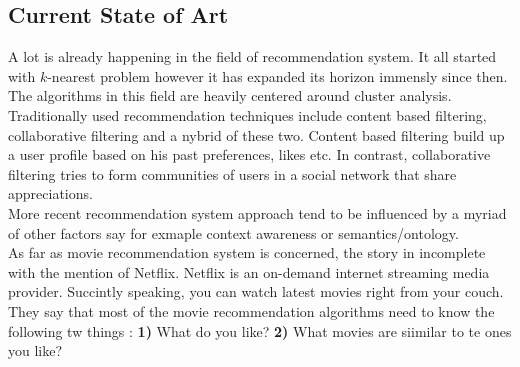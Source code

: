 \documentclass[twocolumn]{article}
\newcommand{\comment}[1]{}
\begin{document}
\subsection{Current State of Art}
A lot is already happening in the field of recommendation system. It all started with $k$-nearest problem however it has expanded its horizon immensly since then. The algorithms in this field are heavily centered around cluster analysis.\\
\newline
Traditionally used recommendation techniques include content based filtering, collaborative filtering and a nybrid of these two. Content based filtering build up a user profile based on his past preferences, likes etc. In contrast, collaborative filtering tries to form communities of users in a social network that share appreciations.\\
\newline
More recent recommendation system approach tend to be influenced by a myriad of other factors say for exmaple context awareness or semantics/ontology.\\
\newline
As far as movie recommendation system is concerned, the story in incomplete with the mention of Netflix. Netflix is an on-demand internet streaming media provider. Succintly speaking, you can watch latest movies right from your couch. They say that most of the movie recommendation algorithms need to know the following tw things : {\bf 1)} What do you like? {\bf 2) } What movies are siimilar to te ones you like?

\comment{

Can also comment out paragraphs, etc.

}
\end{document}
